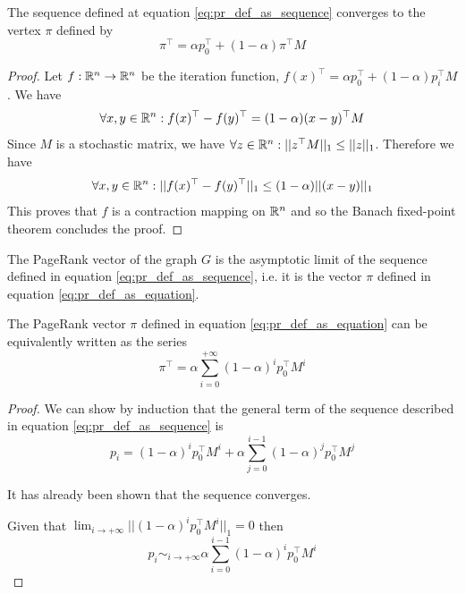 \begin{property}\label{prop:pr_def_as_equation}
    The sequence defined at equation \ref{eq:pr_def_as_sequence} converges to the vertex $\pi$ defined by 
    \begin{equation}\label{eq:pr_def_as_equation}
        \pi^\top = \alpha p_0^\top + (1-\alpha)\pi^\top M
    \end{equation}
\end{property}
\begin{proof}
    Let $f : \mathbb{R}^n \rightarrow \mathbb{R}^n$ be the iteration function, $f(x)^\top =\alpha p_0^\top + (1-\alpha)p_i^\top M$. We have 
    \begin{equation*}
        \forall x, y \in \mathbb{R}^n : f(x)^\top - f(y)^\top = (1-\alpha)(x-y)^\top M
    \end{equation*}
    Since $M$ is a stochastic matrix, we have $\forall z \in \mathbb{R}^n : ||z^\top M||_1 \leq ||z||_1$. Therefore we have 
    \begin{equation*}
        \forall x, y \in \mathbb{R}^n : ||f(x)^\top - f(y)^\top||_1 \leq (1-\alpha)||(x-y)||_1
    \end{equation*}
    This proves that $f$ is a contraction mapping on $\mathbb{R}^n$ and so the Banach fixed-point theorem concludes the proof.
\end{proof}

The PageRank vector of the graph $G$ is the asymptotic limit of the sequence defined in equation \ref{eq:pr_def_as_sequence}, i.e. it is the vector $\pi$ defined in equation \ref{eq:pr_def_as_equation}.

\begin{property}\label{prop:pr_def_as_series}
    The PageRank vector $\pi$ defined in equation \ref{eq:pr_def_as_equation} can be equivalently written as the series
    \begin{equation}\label{eq:pr_def_as_series}
        \pi^\top = \alpha \sum_{i = 0}^{+\infty} (1-\alpha)^i p_0^\top M^i
    \end{equation}
\end{property}
\begin{proof}
    We can show by induction that the general term of the sequence described in equation \ref{eq:pr_def_as_sequence} is
    \begin{equation*}
        p_i = (1-\alpha)^i p_0^\top M^i + \alpha \sum_{j = 0}^{i-1} (1-\alpha)^j p_0^\top M^j
    \end{equation*}

    It has already been shown that the sequence converges. 
    
    Given that $\lim_{i \to +\infty} ||(1-\alpha)^i p_0^\top M^i||_1 = 0$ then
    \begin{equation*}
        p_i \sim_{i \to +\infty} \alpha \sum_{i = 0}^{i-1} (1-\alpha)^i p_0^\top M^i
    \end{equation*}
\end{proof}

